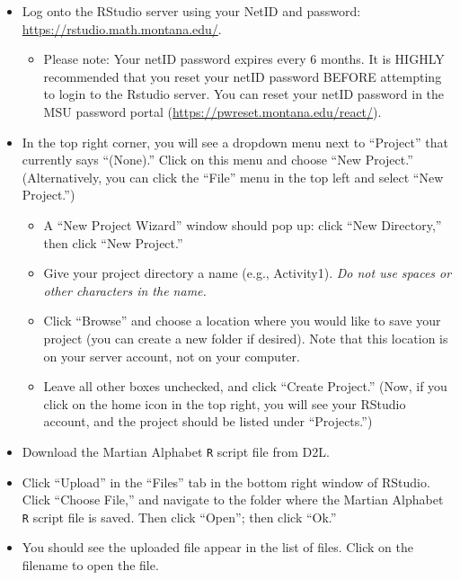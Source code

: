 \documentclass[
]{report}
\providecommand{\tightlist}{%
  \setlength{\itemsep}{0pt}\setlength{\parskip}{0pt}}
\begin{document}
\begin{itemize}
\item
  Log onto the RStudio server using your NetID and password: \url{https://rstudio.math.montana.edu/}.

  \begin{itemize}
  \tightlist
  \item
    Please note: Your netID password expires every 6 months. It is HIGHLY recommended that you reset your netID password BEFORE attempting to login to the Rstudio server. You can reset your netID password in the MSU password portal (\url{https://pwreset.montana.edu/react/}).
  \end{itemize}
\item
  In the top right corner, you will see a dropdown menu next to ``Project'' that currently says ``(None).'' Click on this menu and choose ``New Project.'' (Alternatively, you can click the ``File'' menu in the top left and select ``New Project.'')

  \begin{itemize}
  \tightlist
  \item
    A ``New Project Wizard'' window should pop up: click ``New Directory,'' then click ``New Project.''
  \item
    Give your project directory a name (e.g., Activity1). \emph{Do not use spaces or other characters in the name.}
  \item
    Click ``Browse'' and choose a location where you would like to save your project (you can create a new folder if desired). Note that this location is on your server account, not on your computer.
  \item
    Leave all other boxes unchecked, and click ``Create Project.'' (Now, if you click on the home icon in the top right, you will see your RStudio account, and the project should be listed under ``Projects.'')
  \end{itemize}
\item
  Download the Martian Alphabet \texttt{R} script file from D2L.
\item
  Click ``Upload'' in the ``Files'' tab in the bottom right window of RStudio. Click ``Choose File,'' and navigate to the folder where the Martian Alphabet \texttt{R} script file is saved. Then click ``Open''; then click ``Ok.''
\item
  You should see the uploaded file appear in the list of files. Click on the filename to open the file.
\end{itemize}
\end{document}
